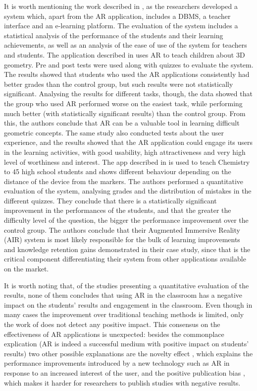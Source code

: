 It is worth mentioning the work described in \citep{chang2018impacts}, as the researchers developed a system which, apart from the AR application, includes a \gls{DBMS}, a teacher interface and an e-learning platform. The evaluation of the system includes a statistical analysis of the performance of the students and their learning achievements, as well as an analysis of the ease of use of the system for teachers and students. The application described in \citep{thamrongrat2019design} uses AR to teach children about 3D geometry. Pre and post tests were used along with quizzes to evaluate the system. The results showed that students who used the AR applications consistently had better grades than the control group, but such results were not statistically significant. Analysing the results for different tasks, though, the data showed that the group who used AR performed worse on the easiest task, while performing much better (with statistically significant results) than the control group. From this, the authors conclude that AR can be a valuable tool in learning difficult geometric concepts. The same study also conducted tests about the user experience, and the results showed that the AR application could engage its users in the learning activities, with good usability, high attractiveness and very high level of worthiness and interest.
The app described in \citep{cen2019augmented} is used to teach Chemistry to 45 high school students and shows different behaviour depending on the distance of the device from the markers. The authors performed a quantitative evaluation of the system, analysing grades and the distribution of mistakes in the different quizzes. They conclude that there is a statistically significant improvement in the performances of the students, and that the greater the difficulty level of the question, the bigger the performance improvement over the control group. The authors conclude that their Augmented Immersive Reality (AIR) system is most likely responsible for the bulk of learning improvements and knowledge retention gains demonstrated in their case study, since that is the critical component differentiating their system from other applications available on the market.

It is worth noting that, of the \papersWithEvaluation studies presenting a quantitative evaluation of the results, none of them concludes that using AR in the classroom has a negative impact on the students' results and engagement in the classroom. Even though in many cases the improvement over traditional teaching methods is limited, only the work of \citet{carlos2020voluminis} does not detect any positive impact. This consensus on the effectiveness of AR applications is unexpected: besides the commonplace explication (AR is indeed a successful medium with positive impact on students' results) two other possible explanations are the novelty effect \citep{pisapia1993learning}, which explains the performance improvements introduced by a new technology such as AR in response to an increased interest of the user, and the positive publication bias \citep{begg1994publication}, which makes it harder for researchers to publish studies with negative results.